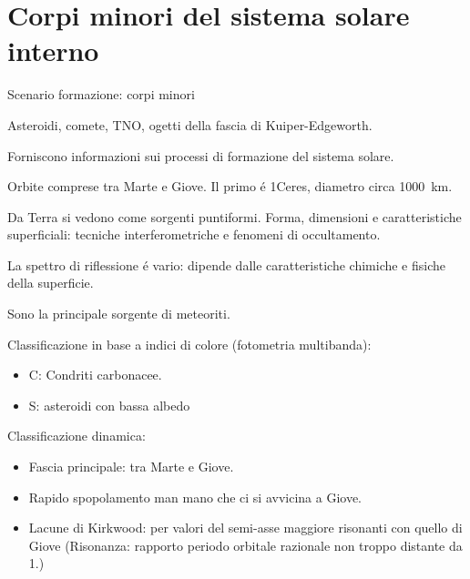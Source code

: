\section{Corpi minori del sistema solare interno}




\begin{frame}{Scenario formazione: corpi minori}

Asteroidi, comete, TNO, ogetti della fascia di Kuiper-Edgeworth.

Forniscono informazioni sui processi di formazione del sistema solare.


Orbite comprese tra Marte e Giove. Il primo \'e 1Ceres, diametro circa \SI{1000}{\kilo\meter}.

Da Terra si vedono come sorgenti puntiformi. Forma, dimensioni e caratteristiche superficiali: tecniche interferometriche e fenomeni di occultamento.

La spettro di riflessione \'e vario: dipende dalle caratteristiche chimiche e fisiche della superficie.

Sono la principale sorgente di meteoriti.

Classificazione in base a indici di colore (fotometria multibanda):
\begin{itemize}
    \item C: Condriti carbonacee.
    \item S: asteroidi con bassa albedo
\end{itemize}

Classificazione dinamica:
\begin{itemize}
    \item Fascia principale: tra Marte e Giove.
    \item Rapido spopolamento man mano che ci si avvicina a Giove.
    \item Lacune di Kirkwood: per valori del semi-asse maggiore risonanti con quello di Giove
    (Risonanza: rapporto periodo orbitale razionale non troppo distante da 1.)
    \end{itemize}
\end{frame}

